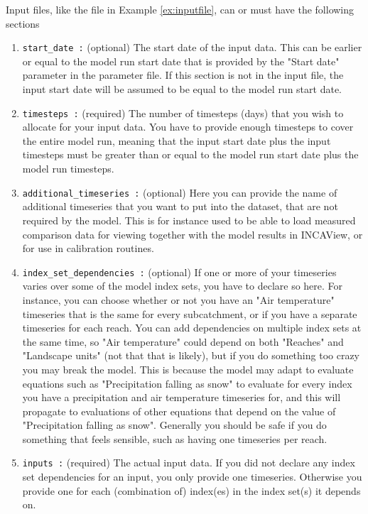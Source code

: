 \documentclass[11pt]{article}
\theoremstyle{definition}
\begin{document}
Input files, like the file in Example \ref{ex:inputfile}, can or must have the following sections
\begin{enumerate}[i]
\item {\tt start\_date :} (optional) The start date of the input data. This can be earlier or equal to the model run start date that is provided by the "Start date" parameter in the parameter file. If this section is not in the input file, the input start date will be assumed to be equal to the model run start date.
\item {\tt timesteps :} (required) The number of timesteps (days) that you wish to allocate for your input data. You have to provide enough timesteps to cover the entire model run, meaning that the input start date plus the input timesteps must be greater than or equal to the model run start date plus the model run timesteps.
\item {\tt additional\_timeseries :} (optional) Here you can provide the name of additional timeseries that you want to put into the dataset, that are not required by the model. This is for instance used to be able to load measured comparison data for viewing together with the model results in INCAView, or for use in calibration routines.
\item {\tt index\_set\_dependencies :} (optional) If one or more of your timeseries varies over some of the model index sets, you have to declare so here. For instance, you can choose whether or not you have an "Air temperature" timeseries that is the same for every subcatchment, or if you have a separate timeseries for each reach. You can add dependencies on multiple index sets at the same time, so "Air temperature" could depend on both "Reaches" and "Landscape units" (not that that is likely), but if you do something too crazy you may break the model. This is because the model may adapt to evaluate equations such as "Precipitation falling as snow" to evaluate for every index you have a precipitation and air temperature timeseries for, and this will propagate to evaluations of other equations that depend on the value of "Precipitation falling as snow". Generally you should be safe if you do something that feels sensible, such as having one timeseries per reach.
\item {\tt inputs :} (required) The actual input data. If you did not declare any index set dependencies for an input, you only provide one timeseries. Otherwise you provide one for each (combination of) index(es) in the index set(s) it depends on.
\end{enumerate}
\end{document}
